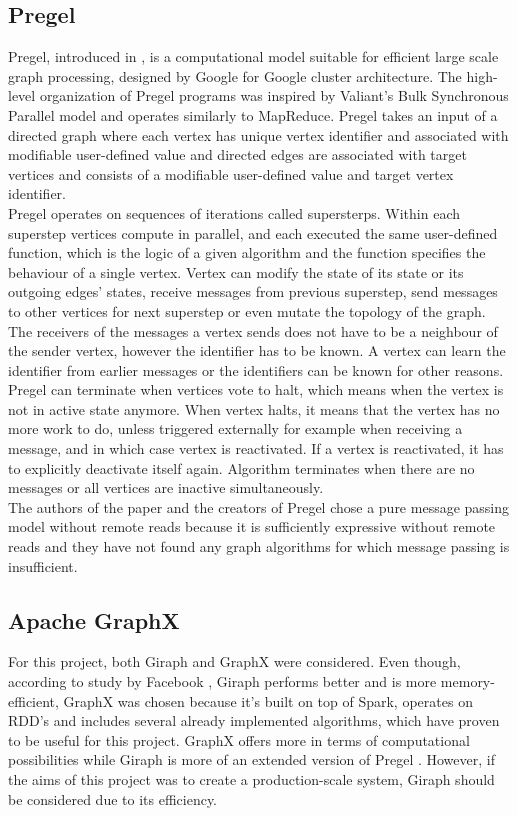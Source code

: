 \documentclass{article}
\theoremstyle{definition}
\begin{document}
\subsection{Pregel}
Pregel, introduced in \cite{Malewicz2010}, is a computational model suitable for efficient large scale graph processing, designed by Google for Google cluster architecture. The high-level organization of Pregel programs was inspired by Valiant's Bulk Synchronous Parallel model and operates similarly to MapReduce. Pregel takes an input of a directed graph where each vertex has unique vertex identifier and associated with modifiable user-defined value and directed edges are associated with target vertices and consists of a modifiable user-defined value and target vertex identifier.\\

Pregel operates on sequences of iterations called supersterps. Within each superstep vertices compute in parallel, and each executed the same user-defined function, which is the logic of a given algorithm and the function specifies the behaviour of a single vertex. Vertex can modify the state of its state or its outgoing edges' states, receive messages from previous superstep, send messages to other vertices for next superstep or even mutate the topology of the graph. The receivers of the messages a vertex sends does not have to be a neighbour of the sender vertex, however the identifier has to be known. A vertex can learn the identifier from earlier messages or the identifiers can be known for other reasons. Pregel can terminate when vertices vote to halt, which means when the vertex is not in active state anymore. When vertex halts, it means that the vertex has no more work to do, unless triggered externally for example when receiving a message, and in which case vertex is reactivated. If a vertex is reactivated, it has to explicitly deactivate itself again. Algorithm terminates when there are no messages or all vertices are inactive simultaneously. \\

The authors of the paper and the creators of Pregel chose a pure message passing model without remote reads because it is sufficiently expressive without remote reads and they have not found any graph algorithms for which message passing is insufficient. \\

\subsection{Apache GraphX}
For this project, both Giraph \cite{giraph} and GraphX \cite{GraphX} were considered. Even though, according to study by Facebook \cite{fbcase}, Giraph performs better and is more memory-efficient, GraphX was chosen because it's built on top of Spark, operates on RDD's and includes several already implemented algorithms, which have proven to be useful for this project. GraphX offers more in terms of computational possibilities while Giraph is more of an extended version of Pregel \cite{Malewicz2010}. However, if the aims of this project was to create a production-scale system, Giraph should be considered due to its efficiency. \\
\end{document}
